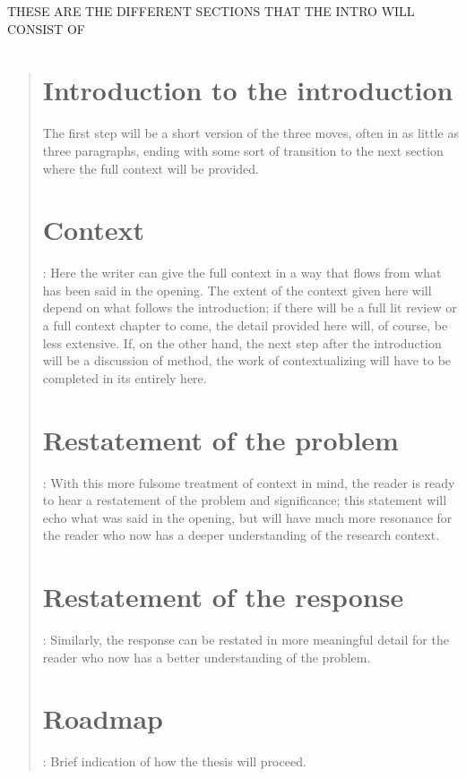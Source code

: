 THESE ARE THE DIFFERENT SECTIONS THAT THE INTRO WILL CONSIST OF
\begin{quote}
\section{Introduction to the introduction} The first step will be a short version of the three moves, often in as little as three paragraphs, ending with some sort of transition to the next section where the full context will be provided.
\section{Context}: Here the writer can give the full context in a way that flows from what has been said in the opening. The extent of the context given here will depend on what follows the introduction; if there will be a full lit review or a full context chapter to come, the detail provided here will, of course, be less extensive. If, on the other hand, the next step after the introduction will be a discussion of method, the work of contextualizing will have to be completed in its entirely here.
\section{Restatement of the problem}: With this more fulsome treatment of context in mind, the reader is ready to hear a restatement of the problem and significance; this statement will echo what was said in the opening, but will have much more resonance for the reader who now has a deeper understanding of the research context.
\section{Restatement of the response}: Similarly, the response can be restated in more meaningful detail for the reader who now has a better understanding of the problem.
\section{Roadmap}: Brief indication of how the thesis will proceed.
\end{quote}
